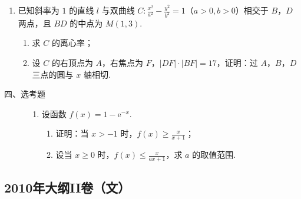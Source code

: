 \begin{description}
\begin{enumerate}[leftmargin=5pt]
        \item 已知斜率为 \(1\) 的直线 \(l\) 与双曲线 \(C: \frac{x^{2}}{a^{2}} - \frac{y^{2}}{b^{2}} = 1\)（\(a > 0, b > 0\)）相交于 \(B\)，\(D\) 两点，且 \(BD\) 的中点为 \(M(1,3)\).
\begin{enumerate}
\item 求 \(C\) 的离心率；
\item 设 \(C\) 的右顶点为 \(A\)，右焦点为 \(F\)，\(|DF| \cdot |BF| = 17\)，证明：过 \(A\)，\(B\)，\(D\) 三点的圆与 \(x\) 轴相切.
\end{enumerate}

    \end{enumerate}

\end{description}

\begin{description}

    \item[四、选考题]

    \begin{enumerate}[leftmargin=5pt]

      \addtocounter{enumi}{+21}

        \item 设函数 \( f(x) = 1 - {\mathrm{e}}^{-x} \).
\begin{enumerate}
\item 证明：当 \(x > -1\) 时，\(f(x) \geqslant \frac{x}{x + 1}\)；
\item 设当 \(x \geqslant 0\) 时，\(f(x) \leqslant \frac{x}{ax + 1}\)，求 \(a\) 的取值范围.
\end{enumerate}

    \end{enumerate}

\end{description}


\subsection{2010年大纲II卷（文）}\label{gk:2010年大纲II卷（文）}

